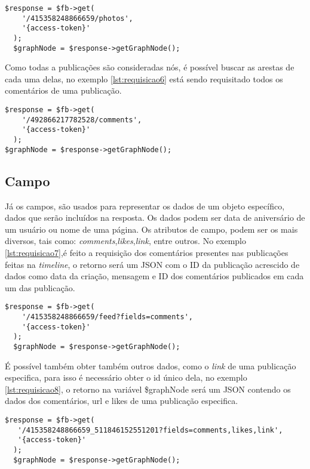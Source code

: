 \begin{lstlisting}[caption={Requisitando todas álbuns de uma página},label={lst:requisicao5}]
  $response = $fb->get( 
    '/415358248866659/photos', 
    '{access-token}'
  );
  $graphNode = $response->getGraphNode();
\end{lstlisting}

Como todas a publicações são consideradas nós, é possível buscar as arestas de cada uma delas, no exemplo \ref{lst:requisicao6} está sendo requisitado todos os comentários de uma publicação.

\begin{lstlisting}[caption={Requisitando todos os comentários de uma publicação},label={lst:requisicao6}]
  $response = $fb->get(
    '/492866217782528/comments',
    '{access-token}'
  );
$graphNode = $response->getGraphNode();
\end{lstlisting}

\subsection{Campo}
Já os campos, são usados para representar os dados de um objeto específico, dados que serão incluídos na resposta. Os dados podem ser data de aniversário de um usuário ou nome de uma página. Os atributos de campo, podem ser os mais diversos, tais como: \textit{comments},\textit{likes},\textit{link}, entre outros. No exemplo \ref{lst:requisicao7},é feito a requisição dos comentários presentes nas publicações feitas na \textit{timeline}, o retorno será um JSON com o ID da publicação acrescido de dados como data da criação, mensagem e ID dos comentários publicados em cada um das publicação.

\begin{lstlisting}[caption={Requisitar os comentários de todas as publicações da página},label={lst:requisicao7}]
  $response = $fb->get(
    '/415358248866659/feed?fields=comments',
    '{access-token}' 
  );
  $graphNode = $response->getGraphNode(); 
\end{lstlisting}

É possível também obter também outros dados, como o \textit{link} de uma publicação especifica, para isso é necessário obter o id único dela, no exemplo \ref{lst:requisicao8}, o retorno na variável \$graphNode será um JSON contendo os dados dos comentários, url e likes de uma publicação especifica.

\begin{lstlisting}[caption={Requsição de diversos atributos},label={lst:requisicao8}]
  $response = $fb->get(
   '/415358248866659_511846152551201?fields=comments,likes,link', 
   '{access-token}'
  );
  $graphNode = $response->getGraphNode();
\end{lstlisting}

